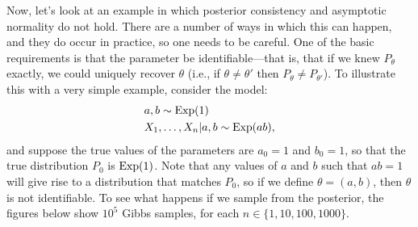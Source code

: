 \documentclass[12pt]{article}
\begin{document}
Now, let's look at an example in which posterior consistency and asymptotic normality do not hold. There are a number of ways in which this can happen, and they do occur in practice, so one needs to be careful. One of the basic requirements is that the parameter be identifiable---that is, that if we knew $P_\theta$ exactly, we could uniquely recover $\theta$  (i.e., if $\theta \neq \theta'$ then $P_\theta \neq P_{\theta'}$). To illustrate this with a very simple example, consider the model:
\begin{align*}
& a,b\sim \operatorname*{Exp}(1)\\
& X_1,\ldots,X_n | a,b\sim \operatorname*{Exp}(a b),
\end{align*}
and suppose the true values of the parameters are $a_0 = 1$ and $b_0 = 1$, so that the true distribution $P_0$ is $\operatorname*{Exp}(1)$. Note that any values of $a$ and $b$ such that $a b = 1$ will give rise to a distribution that matches $P_0$, so if we define $\theta = (a,b)$, then $\theta$ is not identifiable. To see what happens if we sample from the posterior, the figures below show $10^5$ Gibbs samples, for each $n\in \{1,10,100,1000 \}$.
\end{document}
